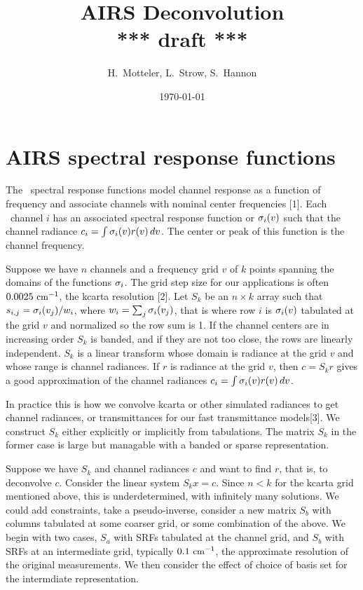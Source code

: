 \documentclass[11pt]{article}
\title{AIRS Deconvolution \\ 
  {***} draft {***}}
\author{H.~Motteler, L.~Strow, S.~Hannon}
\date{\today}
\begin{document}
\maketitle

\section{AIRS spectral response functions}

The \AIRS\ spectral response functions model channel response as 
a function of frequency and associate channels with nominal center
frequencies [1].  Each \AIRS\ channel $i$ has an associated spectral
response function or {\SRF} $\sigma_i(v)$ such that the channel
radiance $c_i = \int \sigma_i(v)r(v)\,dv$.  The center or peak of this
function is the channel frequency.

Suppose we have $n$ channels and a frequency grid $v$ of $k$ 
points spanning the domains of the functions $\sigma_i$.  The grid
step size for our applications is often $0.0025\ \mbox{\small cm}^{-1}$, the
kcarta resolution [2].  Let $S_k$ be an $n\times k$ array such that
$s_{i,j} = \sigma_i(v_j)/w_i$, where $w_i = \sum_j \sigma_i(v_j)$, that
is where row $i$ is $\sigma_i(v)$ tabulated at the grid $v$ and
normalized so the row sum is 1.  If the channel centers are in
increasing order $S_k$ is banded, and if they are not too close, 
the rows are linearly independent.  $S_k$ is a linear transform
whose domain is radiance at the grid $v$ and whose range is channel
radiances.  If $r$ is radiance at the grid $v$, then $c = S_k r$
gives a good approximation of the channel radiances $c_i =
\int\sigma_i(v)r(v)\,dv$.

In practice this is how we convolve kcarta or other simulated
radiances to get {\AIRS} channel radiances, or transmittances 
for our fast transmittance models[3].  We construct $S_k$ either
explicitly or implicitly from {\AIRS} {\SRF} tabulations.  The
matrix $S_k$ in the former case is large but managable with a banded
or sparse representation.

Suppose we have $S_k$ and channel radiances $c$ and want to find
$r$, that is, to deconvolve $c$.  Consider the linear system $S_k x
= c$.  Since $n < k$ for the kcarta grid mentioned above, this is
underdetermined, with infinitely many solutions.  We could add
constraints, take a pseudo-inverse, consider a new matrix $S_b$ with
columns tabulated at some coarser grid, or some combination of the
above.  We begin with two cases, $S_a$ with SRFs tabulated at the
{\AIRS} channel grid, and $S_b$ with SRFs at an intermediate grid,
typically $0.1\ \mbox{\small cm}^{-1}$, the approximate resolution of the original
measurements.  We then consider the effect of choice of basis set
for the intermdiate representation.
\end{document}
